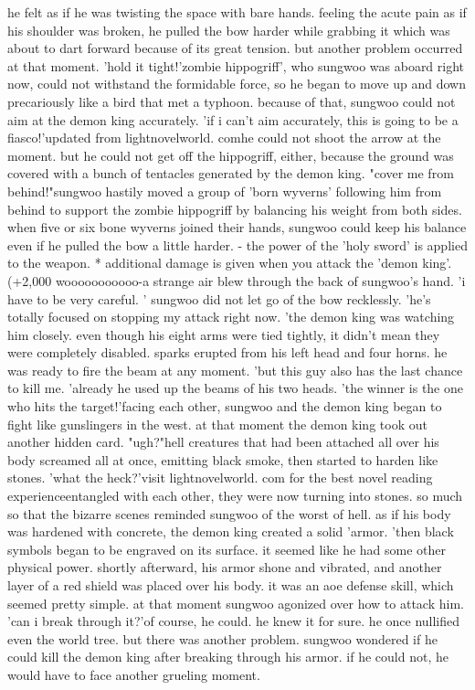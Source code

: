 he felt as if he was twisting the space with bare hands.
feeling the acute pain as if his shoulder was broken, he pulled the bow harder while grabbing it which was about to dart forward because of its great tension.
but another problem occurred at that moment.
 'hold it tight!'zombie hippogriff', who sungwoo was aboard right now, could not withstand the formidable force, so he began to move up and down precariously like a bird that met a typhoon.
 because of that, sungwoo could not aim at the demon king accurately.
 'if i can't aim accurately, this is going to be a fiasco!'updated from lightnov‌elworld.
c­omhe could not shoot the arrow at the moment.
 but he could not get off the hippogriff, either, because the ground was covered with a bunch of tentacles generated by the demon king.
"cover me from behind!"sungwoo hastily moved a group of 'born wyverns' following him from behind to support the zombie hippogriff by balancing his weight from both sides.
when five or six bone wyverns joined their hands, sungwoo could keep his balance even if he pulled the bow a little harder.
 - the power of the 'holy sword' is applied to the weapon.
* additional damage is given when you attack the 'demon king'.
 (+2,000%
wooooooooooo-a strange air blew through the back of sungwoo's hand.
'i have to be very careful.
' sungwoo did not let go of the bow recklessly.
 'he's totally focused on stopping my attack right now.
'the demon king was watching him closely.
 even though his eight arms were tied tightly, it didn't mean they were completely disabled.
sparks erupted from his left head and four horns.
 he was ready to fire the beam at any moment.
'but this guy also has the last chance to kill me.
'already he used up the beams of his two heads.
'the winner is the one who hits the target!'facing each other, sungwoo and the demon king began to fight like gunslingers in the west.
 at that moment the demon king took out another hidden card.
 "ugh?"hell creatures that had been attached all over his body screamed all at once, emitting black smoke, then started to harden like stones.
'what the heck?'visit lightnovelworld.
c­om for the best novel reading experienceentangled with each other, they were now turning into stones.
 so much so that the bizarre scenes reminded sungwoo of the worst of hell.
as if his body was hardened with concrete, the demon king created a solid 'armor.
'then black symbols began to be engraved on its surface.
 it seemed like he had some other physical power.
 shortly afterward, his armor shone and vibrated, and another layer of a red shield was placed over his body.
it was an aoe defense skill, which seemed pretty simple.
at that moment sungwoo agonized over how to attack him.
'can i break through it?'of course, he could.
 he knew it for sure.
 he once nullified even the world tree.
but there was another problem.
 sungwoo wondered if he could kill the demon king after breaking through his armor.
 if he could not, he would have to face another grueling moment.
 

